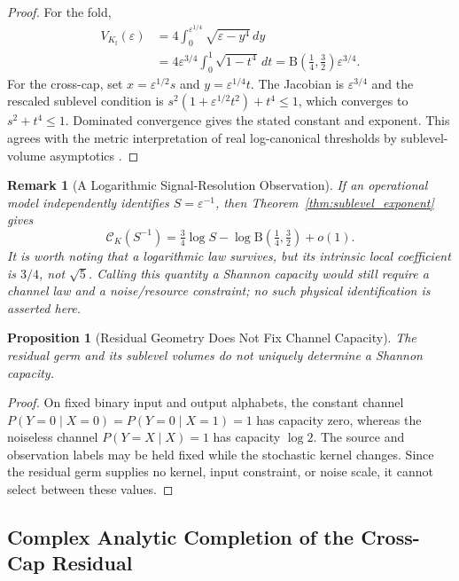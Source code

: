 \documentclass[11pt]{article}
\newtheorem{proposition}[theorem]{Proposition}
\newtheorem{remark}[theorem]{Remark}
\begin{document}
\begin{proof}
For the fold,
\begin{align*}
V_{K_{\mathrm f}}(\varepsilon)
 &=4\int_0^{\varepsilon^{1/4}}\sqrt{\varepsilon-y^4}\,dy\\
 &=4\varepsilon^{3/4}\int_0^1\sqrt{1-t^4}\,dt
 =\mathrm B\!\left(\tfrac14,\tfrac32\right)\varepsilon^{3/4}.
\end{align*}
For the cross-cap, set $x=\varepsilon^{1/2}s$ and
$y=\varepsilon^{1/4}t$.  The Jacobian is $\varepsilon^{3/4}$ and the rescaled
sublevel condition is
$s^2(1+\varepsilon^{1/2}t^2)+t^4\le1$, which converges to
$s^2+t^4\le1$.  Dominated convergence gives the stated constant and exponent.
This agrees with the metric interpretation of real log-canonical thresholds by
sublevel-volume asymptotics \cite{Grulha2026}.
\end{proof}

\begin{remark}[A Logarithmic Signal-Resolution Observation]
If an operational model independently identifies $S=\varepsilon^{-1}$, then
Theorem~\ref{thm:sublevel_exponent} gives
\[
  \mathcal C_K(S^{-1})=\tfrac34\log S
  -\log\mathrm B\!\left(\tfrac14,\tfrac32\right)+o(1).
\]
It is worth noting that a logarithmic law survives, but its intrinsic local
coefficient is $3/4$, not $\sqrt5$.  Calling this quantity a Shannon capacity
would still require a channel law and a noise/resource constraint; no such
physical identification is asserted here.
\end{remark}

\begin{proposition}[Residual Geometry Does Not Fix Channel Capacity]
\label{prop:capacity_nogo}
The residual germ and its sublevel volumes do not uniquely determine a Shannon
capacity.
\end{proposition}

\begin{proof}
On fixed binary input and output alphabets, the constant channel
$P(Y=0\mid X=0)=P(Y=0\mid X=1)=1$ has capacity zero, whereas the noiseless
channel $P(Y=X\mid X)=1$ has capacity $\log 2$.  The source and observation
labels may be held fixed while the stochastic kernel changes.  Since the
residual germ supplies no kernel, input constraint, or noise scale, it cannot
select between these values.
\end{proof}

\subsection{Complex Analytic Completion of the Cross-Cap Residual}
\end{document}
